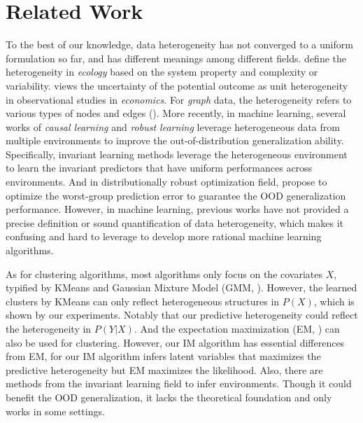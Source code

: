 \section{Related Work}
To the best of our knowledge, data heterogeneity has not converged to a uniform formulation so far, and has different meanings among different fields.
\cite{li1995definition} define the heterogeneity in \emph{ecology} based on the system property and complexity or variability.
\cite{rosenbaum2005heterogeneity} views the uncertainty of the potential outcome as unit heterogeneity in observational studies in \emph{economics}.
For \emph{graph} data, the heterogeneity refers to various types of nodes and edges (\cite{wang2019heterogeneous}).
More recently, in machine learning, several works of \emph{causal learning} \citep{peters2016causal, arjovsky2019invariant, koyama2020out, creager2021environment} and \emph{robust learning} \citep{sagawa2019distributionally} leverage heterogeneous data from multiple environments to improve the out-of-distribution generalization ability.
Specifically, invariant learning methods \citep{arjovsky2019invariant, koyama2020out, creager2021environment, zhou2022model} leverage the heterogeneous environment to learn the invariant predictors that have uniform performances across environments.
And in distributionally robust optimization field, \cite{sagawa2019distributionally, duchi2022distributionally} propose to optimize the worst-group prediction error to guarantee the OOD generalization performance.
However, in machine learning, previous works have not provided a precise definition or sound quantification of data heterogeneity, which makes it confusing and hard to leverage to develop more rational machine learning algorithms.

As for clustering algorithms, most algorithms only focus on the covariates $X$, typified by KMeans and Gaussian Mixture Model (GMM, \citep{reynolds2009gaussian}).
However, the learned clusters by KMeans can only reflect heterogeneous structures in $P(X)$, which is shown by our experiments.
Notably that our predictive heterogeneity could reflect the heterogeneity in $P(Y|X)$.
And the expectation maximization (EM, \citep{moon1996expectation}) can also be used for clustering.
However, our IM algorithm has essential differences from EM, for our IM algorithm infers latent variables that maximizes the predictive heterogeneity but EM maximizes the likelihood.
Also, there are methods \citep{creager2021environment} from the invariant learning field to infer environments.
Though it could benefit the OOD generalization, it lacks the theoretical foundation and only works in some settings.

